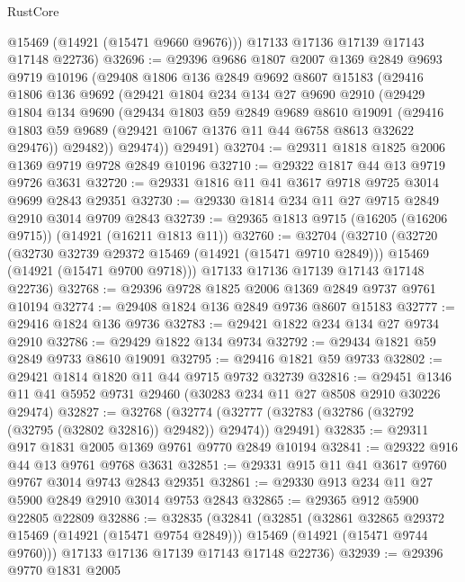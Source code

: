 \begin{lexlean}{RustCore}
\begin{coremodule}
        @15469
        (@14921 (@15471 @9660 @9676)))
      @17133
      @17136
      @17139
      @17143
      @17148
      @22736)
@32696 := @29396
    @9686
    @1807
    @2007
    @1369
    @2849
    @9693
    @9719
    @10196
    (@29408
      @1806
      @136
      @2849
      @9692
      @8607
      @15183
      (@29416
        @1806
        @136
        @9692
        (@29421
          @1804
          @234
          @134
          @27
          @9690
          @2910
          (@29429
            @1804
            @134
            @9690
            (@29434
              @1803
              @59
              @2849
              @9689
              @8610
              @19091
              (@29416 @1803 @59 @9689 (@29421 @1067 @1376 @11 @44 @6758 @8613 @32622 @29476))
              @29482))
          @29474))
      @29491)
@32704 := @29311 @1818 @1825 @2006 @1369 @9719 @9728 @2849 @10196
@32710 := @29322 @1817 @44 @13 @9719 @9726 @3631
@32720 := @29331 @1816 @11 @41 @3617 @9718 @9725 @3014 @9699 @2843 @29351
@32730 := @29330 @1814 @234 @11 @27 @9715 @2849 @2910 @3014 @9709 @2843
@32739 := @29365 @1813 @9715 (@16205 (@16206 @9715)) (@14921 (@16211 @1813 @11))
@32760 := @32704
    (@32710
      (@32720
        (@32730 @32739 @29372 @15469 (@14921 (@15471 @9710 @2849)))
        @15469
        (@14921 (@15471 @9700 @9718)))
      @17133
      @17136
      @17139
      @17143
      @17148
      @22736)
@32768 := @29396 @9728 @1825 @2006 @1369 @2849 @9737 @9761 @10194
@32774 := @29408 @1824 @136 @2849 @9736 @8607 @15183
@32777 := @29416 @1824 @136 @9736
@32783 := @29421 @1822 @234 @134 @27 @9734 @2910
@32786 := @29429 @1822 @134 @9734
@32792 := @29434 @1821 @59 @2849 @9733 @8610 @19091
@32795 := @29416 @1821 @59 @9733
@32802 := @29421 @1814 @1820 @11 @44 @9715 @9732 @32739
@32816 := @29451 @1346 @11 @41 @5952 @9731 @29460 (@30283 @234 @11 @27 @8508 @2910 @30226 @29474)
@32827 := @32768
    (@32774 (@32777 (@32783 (@32786 (@32792 (@32795 (@32802 @32816)) @29482)) @29474)) @29491)
@32835 := @29311 @917 @1831 @2005 @1369 @9761 @9770 @2849 @10194
@32841 := @29322 @916 @44 @13 @9761 @9768 @3631
@32851 := @29331 @915 @11 @41 @3617 @9760 @9767 @3014 @9743 @2843 @29351
@32861 := @29330 @913 @234 @11 @27 @5900 @2849 @2910 @3014 @9753 @2843
@32865 := @29365 @912 @5900 @22805 @22809
@32886 := @32835
    (@32841
      (@32851
        (@32861 @32865 @29372 @15469 (@14921 (@15471 @9754 @2849)))
        @15469
        (@14921 (@15471 @9744 @9760)))
      @17133
      @17136
      @17139
      @17143
      @17148
      @22736)
@32939 := @29396
    @9770
    @1831
    @2005

\end{coremodule}
\end{lexlean}
